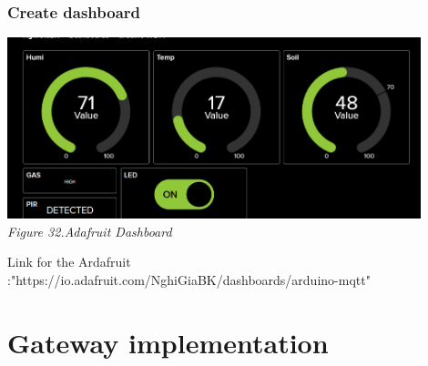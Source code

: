 \documentclass[a4paper]{article}
\begin{document}
\subsubsection{Create dashboard}
\begin{center}
    \includegraphics[width=12cm]{pictures/Adafruit.png}\\
    \textit{Figure 32.Adafruit Dashboard}\\
\end{center}
Link for the Ardafruit :"https://io.adafruit.com/NghiGiaBK/dashboards/arduino-mqtt"
\newpage
\section{Gateway implementation}
\end{document}
